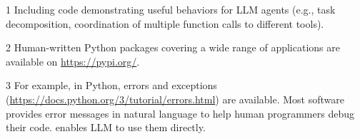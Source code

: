 \begin{table}[!t]
{\begin{threeparttable}
\begin{tabular}{@{} p{5.3cm} p{7.5cm} p{7cm} @{}}
\bottomrule
\end{tabular}
\begin{tablenotes}
    \item[1] Including code demonstrating useful behaviors for LLM agents (e.g., task decomposition, coordination of multiple function calls to different tools).
    \item[2] Human-written Python packages covering a wide range of applications are available on \url{https://pypi.org/}.
    \item[3] For example, in Python, errors and exceptions (\url{https://docs.python.org/3/tutorial/errors.html}) are available. Most software provides error messages in natural language to help human programmers debug their code. \approach enables LLM to use them directly.
\end{tablenotes}
\end{threeparttable}
}
\label{tab:codeact_comparison_table}
\vspace{-14pt}
\end{table}